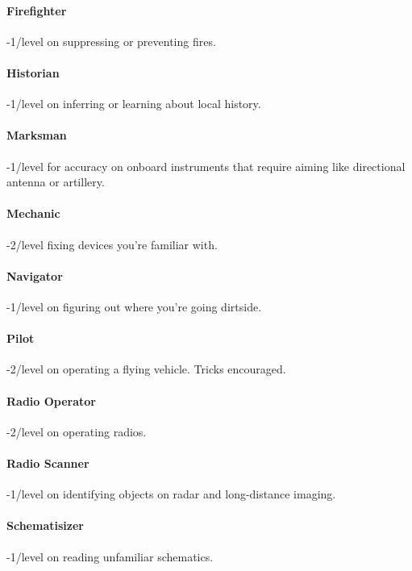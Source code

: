\paragraph{Firefighter}
\hypertarget{SkillFirefighter}{}
-1/level on suppressing or preventing fires.

\paragraph{Historian}
\hypertarget{SkillHistorian}{}
-1/level on inferring or learning about local history.

\paragraph{Marksman}
\hypertarget{SkillMarksman}{}
-1/level for accuracy on onboard instruments that require aiming like directional antenna or artillery.

\paragraph{Mechanic}
\hypertarget{SkillMechanic}{}
-2/level fixing devices you're familiar with.

\paragraph{Navigator}
\hypertarget{SkillNavigator}{}
-1/level on figuring out where you're going dirtside.

\paragraph{Pilot}
\hypertarget{SkillPilot}{}
-2/level on operating a flying vehicle. Tricks encouraged.

\paragraph{Radio Operator}
\hypertarget{SkillRadioOperator}{}
-2/level on operating radios.

\paragraph{Radio Scanner}
\hypertarget{SkillRadioScanner}{}
-1/level on identifying objects on radar and long-distance imaging.

\paragraph{Schematisizer}
\hypertarget{SkillSchematisizer}{}
-1/level on reading unfamiliar schematics.

